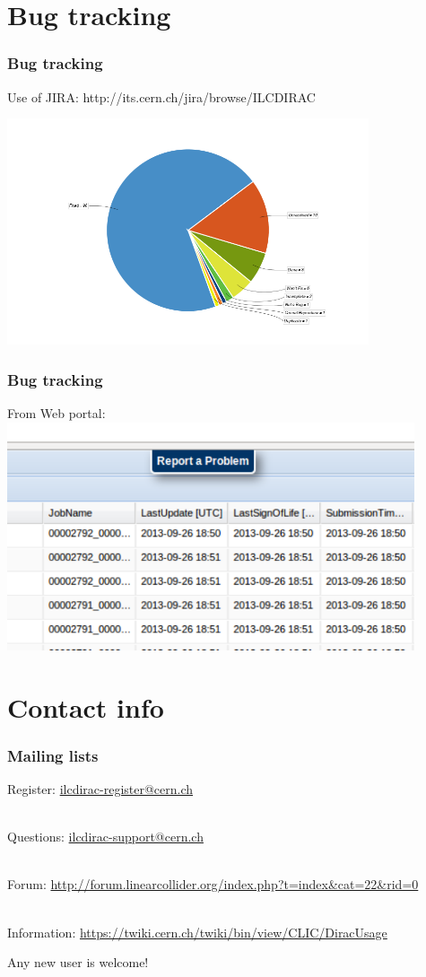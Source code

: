 \documentclass[10pt,table,dvipsnames]{beamer}
\begin{document}
\section{Bug tracking}
\begin{frame}
\frametitle{Bug tracking}
Use of JIRA: http://its.cern.ch/jira/browse/ILCDIRAC
\begin{center}
\includegraphics[width=0.8\textwidth]{charts_1}
\end{center}
\end{frame}
\begin{frame}
\frametitle{Bug tracking}
From Web portal:
\centering
\includegraphics[width=0.9\textwidth]{ReportProb} 
\end{frame}

\section{Contact info}
\begin{frame}
\frametitle{Mailing lists}
Register: \url{ilcdirac-register@cern.ch}

~\\

Questions: \url{ilcdirac-support@cern.ch}

~\\

Forum: {\small \url{http://forum.linearcollider.org/index.php?t=index&cat=22&rid=0}}

~\\

Information: {\small\url{https://twiki.cern.ch/twiki/bin/view/CLIC/DiracUsage}}
\vfill
\begin{center}
\alert{\Large Any new user is welcome!}
\end{center}

\end{frame} 
\end{document}
